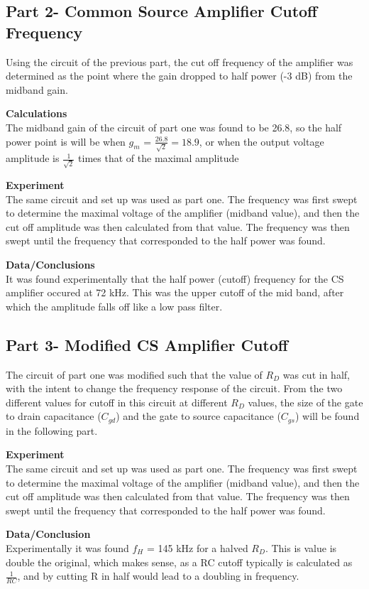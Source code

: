 \documentclass[12pt]{article}
\begin{document}
\subsection*{Part 2- Common Source Amplifier Cutoff Frequency}
Using the circuit of the previous part, the cut off frequency of the amplifier was determined as the point where the gain dropped to half power (-3 dB) from the midband gain.\\\par
\textbf{Calculations}\\
The midband gain of the circuit of part one was found to be 26.8, so the half power point is will be when $g_m$ = $\frac{26.8}{\sqrt{2}}= 18.9$, or when the output voltage amplitude is $\frac{1}{\sqrt{2}}$ times that of the maximal amplitude\\\par
\textbf{Experiment}\\
The same circuit and set up was used as part one. The frequency was first swept to determine the maximal voltage of the amplifier (midband value), and then the cut off amplitude was then calculated from that value. The frequency was then swept until the frequency that corresponded to the half power was found.\\\par 
\textbf{Data/Conclusions}\\
It was found experimentally that the half power (cutoff) frequency for the CS amplifier occured at 72 kHz. This was the upper cutoff of the mid band, after which the amplitude falls off like a low pass filter.
\subsection*{Part 3- Modified CS Amplifier Cutoff}
The circuit of part one was modified such that the value of $R_D$ was cut in half, with the intent to change the frequency response of the circuit. From the two different values for cutoff in this circuit at different $R_D$ values, the size of the gate to drain capacitance ($C_{gd}$) and the gate to source capacitance ($C_{gs}$) will be found in the following part.\\\par
\textbf{Experiment}\\
The same circuit and set up was used as part one. The frequency was first swept to determine the maximal voltage of the amplifier (midband value), and then the cut off amplitude was then calculated from that value. The frequency was then swept until the frequency that corresponded to the half power was found.\\\par
\textbf{Data/Conclusion}\\
Experimentally it was found $f_H$ = 145 kHz for a halved $R_D$. This is value is double the original, which makes sense, as a RC cutoff typically is calculated as $\frac{1}{RC}$, and by cutting R in half would lead to a doubling in frequency.
\end{document}
